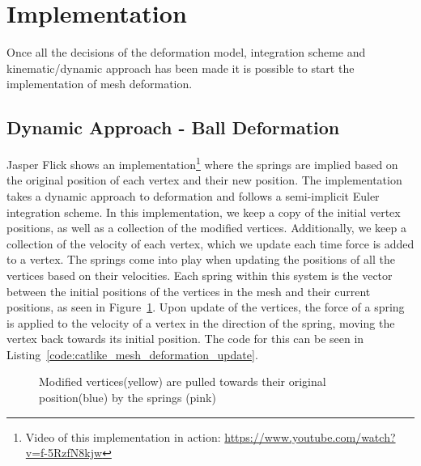 \section{Implementation}
Once all the decisions of the deformation model, integration scheme and kinematic/dynamic approach has been made it is possible to start the implementation of mesh deformation.

\subsection{Dynamic Approach - Ball Deformation}
Jasper Flick\cite{catlike_mesh_deformation} shows an implementation\footnote{Video of this implementation in action: \url{https://www.youtube.com/watch?v=f-5RzfN8kjw}} where the springs are implied based on the original position of each vertex and their new position.
The implementation takes a dynamic approach to deformation and follows a semi-implicit Euler integration scheme.
In this implementation, we keep a copy of the initial vertex positions, as well as a collection of the modified vertices.
Additionally, we keep a collection of the velocity of each vertex, which we update each time force is added to a vertex.
The springs come into play when updating the positions of all the vertices based on their velocities.
Each spring within this system is the vector between the initial positions of the vertices in the mesh and their current positions, as seen in Figure~\ref{fig:catlike_mesh_deformation_springs}.
Upon update of the vertices, the force of a spring is applied to the velocity of a vertex in the direction of the spring, moving the vertex back towards its initial position.
The code for this can be seen in Listing~\ref{code:catlike_mesh_deformation_update}.

\begin{figure}
\centering
    \caption{Modified vertices(yellow) are pulled towards their original position(blue) by the springs (pink)\cite{catlike_mesh_deformation}}
    \label{fig:catlike_mesh_deformation_springs}
\end{figure}

